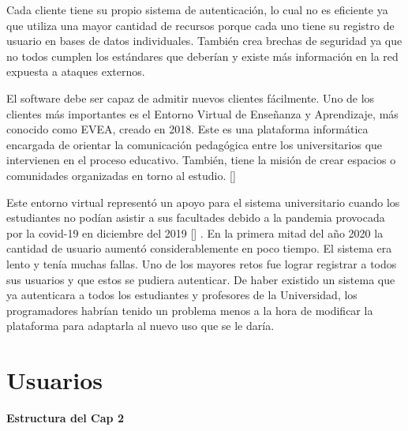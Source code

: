 Cada cliente tiene su propio sistema de autenticación, lo cual no es eficiente ya que utiliza una mayor cantidad de recursos porque cada uno tiene su registro de usuario en bases de datos individuales. También crea brechas de seguridad ya que no todos cumplen los estándares que deberían y existe más información en la red expuesta a ataques externos. 

El software debe ser capaz de admitir nuevos clientes fácilmente. 
Uno de los clientes más importantes es el Entorno Virtual de Enseñanza y Aprendizaje, más conocido como EVEA, creado en 2018. Este es una plataforma informática encargada de orientar la comunicación pedagógica entre los universitarios que intervienen en el proceso educativo. También, tiene la misión de crear espacios o comunidades organizadas en torno al estudio. [\cite{evea-cd}] 

Este entorno virtual representó un apoyo para el sistema universitario cuando los estudiantes no podían asistir a sus facultades debido a la pandemia provocada por la covid-19 en diciembre del 2019 [\cite{ferrer2020pandemia}] . En la primera mitad del año 2020 la cantidad de usuario aumentó considerablemente en poco tiempo. El sistema era lento y tenía muchas fallas. Uno de los mayores retos fue lograr registrar a todos sus usuarios y que estos se pudiera autenticar. De haber existido un sistema que ya autenticara a todos los estudiantes y profesores de la Universidad, los programadores habrían tenido un problema menos a la hora de modificar la plataforma para adaptarla al nuevo uso que se le daría.



\section*{Usuarios}


\textbf{Estructura del Cap 2}

